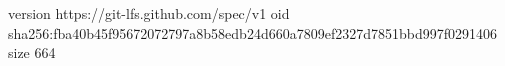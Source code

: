 version https://git-lfs.github.com/spec/v1
oid sha256:fba40b45f95672072797a8b58edb24d660a7809ef2327d7851bbd997f0291406
size 664
